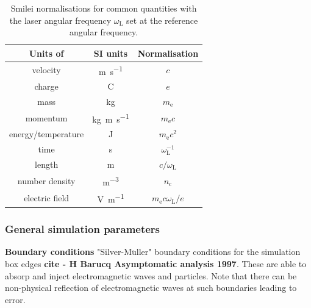 \begin{table}
\begin{center}
\begin{tabular}{ccc}
	 \hline \hline
	Units of & SI units & Normalisation \\
	\hline
	velocity & \unit{m.s^{-1}} & $c$ \\
	charge & C & $e$ \\
	mass & kg & $m_\mathrm{e}$ \\
	momentum & \unit{kg.m.s^{-1}} & $m_\mathrm{e}c$ \\
	energy/temperature & J & $m_\mathrm{e}c^2$ \\
	time & s & $\omega^{-1}_\mathrm{L}$ \\
	length & m & $c/\omega_\mathrm{L}$ \\
	number density & \unit{m^{-3}} & $n_\mathrm{c}$ \\
	electric field & \unit{V.m^{-1}} & $m_\mathrm{e}c\omega_\mathrm{L}/e$ \\
	\hline \hline
\end{tabular}
	\caption{\label{tab:intro-normalisations} Smilei normalisations for common quantities with the laser angular frequency $\omega_\mathrm{L}$ set at the reference angular frequency.}
\end{center}
\end{table}



\subsubsection{General simulation parameters}\label{sec:intro-general_simulation_paramers}
\textbf{Boundary conditions}
"Silver-M$\ddot{\mathrm{u}}$ller" boundary conditions for the simulation box edges \textbf{cite - H Barucq Asymptomatic analysis 1997}. These are able to absorp and inject electromagnetic waves and particles. Note that there can be non-physical reflection of electromagnetic waves at such boundaries leading to error.

